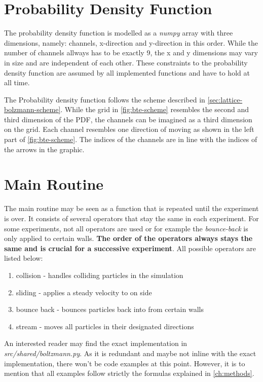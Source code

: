 \section{Probability Density Function}
The probability density function is modelled as a \textit{numpy} array with three dimensions, namely: channels, x-direction and y-direction in this order.
While the number of channels allways has to be exactly 9, the x and y dimensions may vary in size and are independent of each other.
These constraints to the probability density function are assumed by all implemented functions and have to hold at all time.
\newline

The Probability density function follows the scheme described in \cref{sec:lattice-bolzmann-scheme}.
While the grid in \cref{fig:bte-scheme} resembles the second and third dimension of the PDF, the channels can be imagined as a third dimension on the grid.
Each channel resembles one direction of moving as shown in the left part of \cref{fig:bte-scheme}.
The indices of the channels are in line with the indices of the arrows in the graphic.


\section{Main Routine}\label{sec:main-routine}
The main routine may be seen as a function that is repeated until the experiment is over.
It consists of several operators that stay the same in each experiment.
For some experiments, not all operators are used or for example the \textit{bounce-back} is only applied to certain walls.
\textbf{The order of the operators always stays the same and is crucial for a successive experiment}.
All possible operators are listed below:
\begin{enumerate}
    \item collision - handles colliding particles in the simulation
    \item sliding - applies a steady velocity to on side
    \item bounce back - bounces particles back into from certain walls
    \item stream - moves all particles in their designated directions
\end{enumerate}

An interested reader may find the exact implementation in \textit{src/shared/boltzmann.py}.
As it is redundant and maybe not inline with the exact implementation, there won't be code examples at this point.
However, it is to mention that all examples follow strictly the formulas explained in \cref{ch:methods}.


